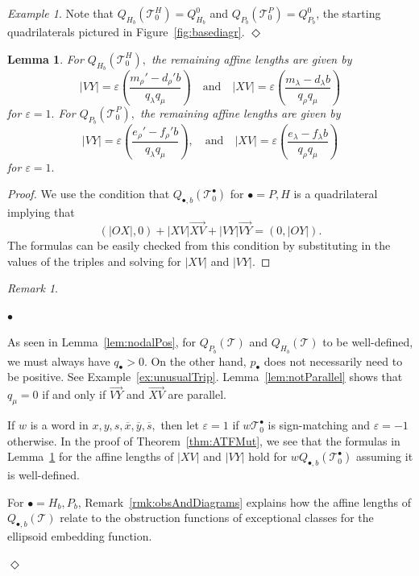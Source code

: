 \documentclass[11pt, reqno]{amsart}
\newtheorem{lemma}[thm]{Lemma}
\theoremstyle{remark}
\numberwithin{equation}{subsection}
\numberwithin{figure}{section}
\theoremstyle{customremark}
\newtheorem{rmk_no_diamond}[thm]{Remark}
\newenvironment{rmk}{\begin{rmk_no_diamond} } {\hfill$\er$ \end{rmk_no_diamond}}
\newtheorem{example_no_diamond}[thm]{Example}
\newenvironment{example}{\begin{example_no_diamond} } {\hfill$\er$ \end{example_no_diamond}}
\newcommand{\Tt}{\mathcal{T}}
\newenvironment{itemlist}
   { \begin{list} {$\bullet$}
         { \setlength{\topsep}{.5ex}  \setlength{\itemsep}{.5ex} \setlength{\leftmargin}{2.5ex} } }
   { \end{list} }
\newcommand{\ovr}{\overrightarrow}
\newcommand{\ov}{\overline}
\newcommand{\la}{{\lambda}}
\newcommand{\er}{{\Diamond}}
\newcommand{\eps}{\varepsilon}
\begin{document}
\begin{example}
    Note that $Q_{H_b}(\Tt_0^H)=Q_{H_b}^0$ and $Q_{P_b}(\Tt_0^P)=Q_{P_b}^0$, the starting quadrilaterals pictured in Figure~\ref{fig:basediagr}. 
\end{example}


\begin{lemma} \label{lem:XVVY}
    For $Q_{H_b}(\Tt_0^H),$ the remaining affine lengths are given by
    \[ |VY|=\eps(\frac{m_\rho'-d_\rho'b}{q_\la q_\mu}) \quad \text{and} \quad 
     |XV|=\eps(\frac{m_\la-d_\la b}{q_\rho q_\mu})\]
     for $\eps=1.$
    For $Q_{P_b}(\Tt_0^P),$ the remaining affine lengths are given by 
    \[ |VY|=\eps(\frac{e_\rho'-f_\rho'b}{q_\la q_\mu}), \quad \text{and} \quad
     |XV|=\eps(\frac{e_\la-f_\la b}{q_\rho q_\mu})\]
     for $\eps=1.$
\end{lemma}
\begin{proof}
    We use the condition that $Q_{\bullet,b}(\Tt_0^\bullet)$ for $\bullet=P,H$ is a quadrilateral implying that
    \[ (|OX|,0)+|XV|\ovr{XV}+|VY|\ovr{VY}=(0,|OY|).\]
     The formulas can be easily checked from this condition by substituting in the values of the triples and solving for $|XV|$ and $|VY|.$
\end{proof}


\begin{rmk} \rm 
    \begin{itemlist}
        \item[{(i)}] As seen in Lemma~\ref{lem:nodalPos}, for $Q_{P_b}(\Tt)$ and $Q_{H_b}(\Tt)$ to be well-defined, we must always have $q_\bullet>0$. On the other hand, $p_\bullet$ does not necessarily need to be positive. See Example~\ref{ex:unusualTrip}. Lemma~\ref{lem:notParallel} shows that $q_\mu = 0$ if and only if $\ovr{VY}$ and $\ovr{XV}$ are parallel. 
      
        \item[{(ii)}] If $w$ is a word in $x,y,s,\ov{x},\ov{y},\ov{s},$ then let $\eps=1$ if $w\Tt_0^\bullet$ is sign-matching and $\eps=-1$ otherwise. 
        In the proof of Theorem~\ref{thm:ATFMut}, we see that the formulas in Lemma~\ref{lem:XVVY} for the affine lengths of $|XV|$ and $|VY|$ hold for $wQ_{\bullet,b}(\Tt_0^\bullet)$ assuming it is well-defined. 
        
        \item[{(iii)}] For $\bullet=H_b,P_b$, Remark~\ref{rmk:obsAndDiagrams} explains how the affine lengths of $Q_{\bullet,b}(\Tt)$ relate to the obstruction functions of exceptional classes for the ellipsoid embedding function. 
       
    \end{itemlist}
\end{rmk}
\end{document}
